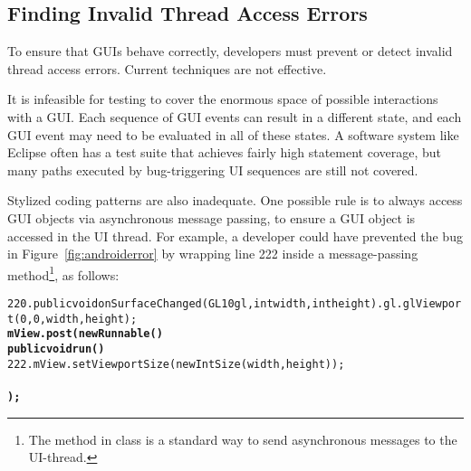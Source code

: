 


\subsection{Finding Invalid Thread Access Errors}
\label{sec:finding}

To ensure that GUIs behave correctly, developers must prevent or detect invalid thread
access errors. Current techniques are not effective. %

It is infeasible for testing to cover the enormous space of possible interactions
with a GUI. Each sequence of GUI events can result in
a different state, and each GUI event may need to be evaluated in all of
these states. A  software system like Eclipse
often has a test suite that achieves fairly high statement coverage,
but many paths executed by bug-triggering UI sequences are still not covered.

Stylized coding patterns are also inadequate. One possible rule is to always
access GUI objects via asynchronous message passing, to ensure a GUI object is accessed in
the UI thread. For example, a developer could have prevented the bug in Figure~\ref{fig:androiderror}
by wrapping line 222 inside a  message-passing method\footnote{The
 method in class  is
a standard way to send asynchronous messages to the UI-thread.}, as follows:

{\vspace{2mm}
\hspace{3mm}{In class: org.mozilla.gecko.gfx.LayerRenderer}
\vspace{-2mm}
\begin{CodeOut}
\begin{alltt}
220. public void onSurfaceChanged(GL10 gl, int width, int height) .     gl.glViewport(0, 0, width, height);
         \textbf{mView.post(new Runnable() \ttlcb}
             \textbf{public void run() \ttlcb}
222.             mView.setViewportSize(new IntSize(width, height));
             \textbf{\ttrcb}
         \textbf{\ttrcb);}
     \ttrcb
\end{alltt}
\end{CodeOut}}

